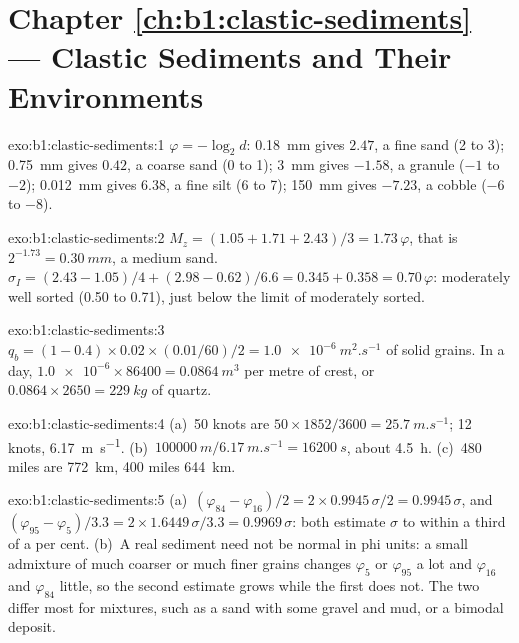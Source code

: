 \section*{Chapter \ref{ch:b1:clastic-sediments} --- Clastic Sediments and Their Environments}

\begin{solution}{exo:b1:clastic-sediments:1}
$\varphi = -\log_2 d$: \qty{0.18}{mm} gives $2.47$, a fine sand (2 to 3);
\qty{0.75}{mm} gives $0.42$, a coarse sand (0 to 1); \qty{3}{mm} gives
$-1.58$, a granule ($-1$ to $-2$); \qty{0.012}{mm} gives $6.38$, a fine silt (6
to 7); \qty{150}{mm} gives $-7.23$, a cobble ($-6$ to $-8$).
\end{solution}

\begin{solution}{exo:b1:clastic-sediments:2}
$M_z = (1.05 + 1.71 + 2.43)/3 = 1.73\,\varphi$, that is $2^{-1.73} =
\qty{0.30}{mm}$, a medium sand. $\sigma_I = (2.43 - 1.05)/4 + (2.98 - 0.62)/6.6
= 0.345 + 0.358 = 0.70\,\varphi$: moderately well sorted (0.50 to 0.71), just
below the limit of moderately sorted.
\end{solution}

\begin{solution}{exo:b1:clastic-sediments:3}
$q_b = (1 - 0.4) \times 0.02 \times (\num{0.01}/60)/2 = \qty{1.0e-6}{m^2.s^{-1}}$
of solid grains. In a day, $\num{1.0e-6} \times 86400 = \qty{0.0864}{m^3}$ per
metre of crest, or $0.0864 \times 2650 = \qty{229}{kg}$ of quartz.
\end{solution}

\begin{solution}{exo:b1:clastic-sediments:4}
(a)~50 knots are $50 \times 1852/3600 = \qty{25.7}{m.s^{-1}}$; 12 knots,
\qty{6.17}{m.s^{-1}}. (b)~$\qty{100000}{m}/\qty{6.17}{m.s^{-1}} =
\qty{16200}{s}$, about \qty{4.5}{h}. (c)~480 miles are \qty{772}{km}, 400 miles
\qty{644}{km}.
\end{solution}

\begin{solution}{exo:b1:clastic-sediments:5}
(a)~$(\varphi_{84} - \varphi_{16})/2 = 2 \times 0.9945\,\sigma/2 =
0.9945\,\sigma$, and $(\varphi_{95} - \varphi_5)/3.3 = 2 \times
1.6449\,\sigma/3.3 = 0.9969\,\sigma$: both estimate $\sigma$ to within a third
of a per cent. (b)~A real sediment need not be normal in phi units: a small
admixture of much coarser or much finer grains changes $\varphi_5$ or
$\varphi_{95}$ a lot and $\varphi_{16}$ and $\varphi_{84}$ little, so the second
estimate grows while the first does not. The two differ most for mixtures, such
as a sand with some gravel and mud, or a bimodal deposit.
\end{solution}

